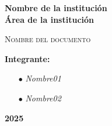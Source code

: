 \begin{titlepage}
    \begin{center}
        {\huge \textbf{Nombre de la institución}}\\
        \vspace{5mm}
        {\LARGE \textbf{Área de la institución}}\\
        \vspace{1cm}
        \centering
		\begin{figure}[h]
		    \centering
	    	\def\svgwidth{0.5\textwidth}
	    	 
		    \label{fig:ejemplo}
		\end{figure}
        \vspace{5mm}

        \LARGE\textsc{Nombre del documento}

        
        \vspace{1cm}
        
        \begin{minipage}{0.9\textwidth}
            {\Large\textbf{Integrante:}}
            \begin{itemize}
                \item[$ \bullet $] \textsl{Nombre01}
				\item[$ \bullet $] \textsl{Nombre02}
            \end{itemize}
        \end{minipage}
        
        \vfill
        {\Huge \textbf{2025}}
    \end{center}
\end{titlepage}